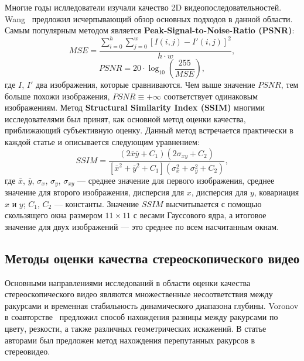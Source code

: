 \documentclass[14pt, a4paper]{extarticle}
\begin{document}
Многие годы ислледователи изучали качество 2D видеопоследовательностей. 
Wang~\cite{wang2006survey} предложил исчерпывающий обзор основных подходов в данной области.
Самым популярным методом является \textbf{Peak-Signal-to-Noise-Ratio (PSNR)}:
\begin{equation*}
	MSE = \frac{\sum_{i=0}^{h}\sum_{j=0}^{w}[I(i, j) - I'(i, j)]^2}{h \cdot w},
\end{equation*}
\begin{equation}
	PSNR = 20 \cdot \log_{10}(\frac{255}{MSE}),
\end{equation}
где $I$, $I'$ два изображения, которые сравниваются. Чем выше значение $PSNR$, 
тем больше похожи изображения, $PSNR \equiv +\infty$ соответствует одинаковым изображениям. 
Метод \textbf{Structural Similarity Index (SSIM)} многими исследователями был принят, 
как основной метод оценки качества, приближающий субъективную оценку. Данный метод встречается
практически в каждой статье и описывается следующим уравнением:
\begin{equation}
	SSIM = \frac{(2\bar{x}\bar{y} + C_1)(2\sigma_{xy} + C_	2)}{[\bar{x}^2 + \bar{y}^2 + C_1](\sigma_x^2 + \sigma_y^2 + C_2)},
\end{equation} 
где $\bar{x}$, $\bar{y}$, $\sigma_x$, $\sigma_y$, $\sigma_{xy}$ --- среднее значение 
для первого изображения, среднее значение для второго изображения, дисперсия для $x$, 
дисперсия для $y$, ковариация $x$ и $y$; $C_1$, $C_2$ --- константы. Значение $SSIM$ 
высчитывается с помощью скользящего окна размером $11 \times 11$ с весами Гауссового ядра, 
а итоговое значение для двух изображений --- это среднее по всем насчитанным окнам.

\subsection{Методы оценки качества стереоскопического видео}

Основными направлениями исследований в области оценки качества стереоскопического видео 
являются множественные несоответствия между ракурсами и временная стабильность 
динамического диапазона глубины. Voronov в соавторстве~\cite{voronov2012towards} предложил
способ нахождения разницы между ракурсами по цвету, резкости, 
а также различных геометрических искажений. В статье~\cite{akimov2012automatic} авторами 
был предложен метод нахождения перепутанных ракурсов в стереовидео. 
\end{document}

